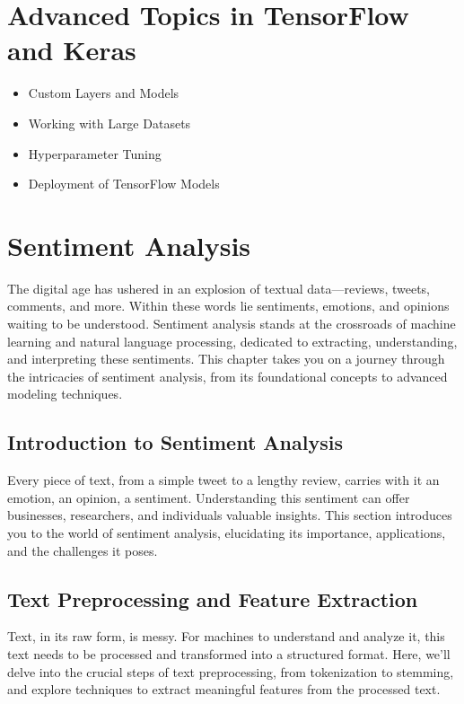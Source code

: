 \documentclass[a4paper,12pt]{book}
\begin{document}
\chapter{Advanced Topics in TensorFlow and Keras}
\begin{itemize}
    \item Custom Layers and Models
    \item Working with Large Datasets
    \item Hyperparameter Tuning
    \item Deployment of TensorFlow Models
\end{itemize}


\chapter{Sentiment Analysis}
The digital age has ushered in an explosion of textual data—reviews, tweets, comments, and more. Within these words lie sentiments, emotions, and opinions waiting to be understood. Sentiment analysis stands at the crossroads of machine learning and natural language processing, dedicated to extracting, understanding, and interpreting these sentiments. This chapter takes you on a journey through the intricacies of sentiment analysis, from its foundational concepts to advanced modeling techniques.

\section{Introduction to Sentiment Analysis}
Every piece of text, from a simple tweet to a lengthy review, carries with it an emotion, an opinion, a sentiment. Understanding this sentiment can offer businesses, researchers, and individuals valuable insights. This section introduces you to the world of sentiment analysis, elucidating its importance, applications, and the challenges it poses.

\section{Text Preprocessing and Feature Extraction}
Text, in its raw form, is messy. For machines to understand and analyze it, this text needs to be processed and transformed into a structured format. Here, we'll delve into the crucial steps of text preprocessing, from tokenization to stemming, and explore techniques to extract meaningful features from the processed text.
\end{document}
